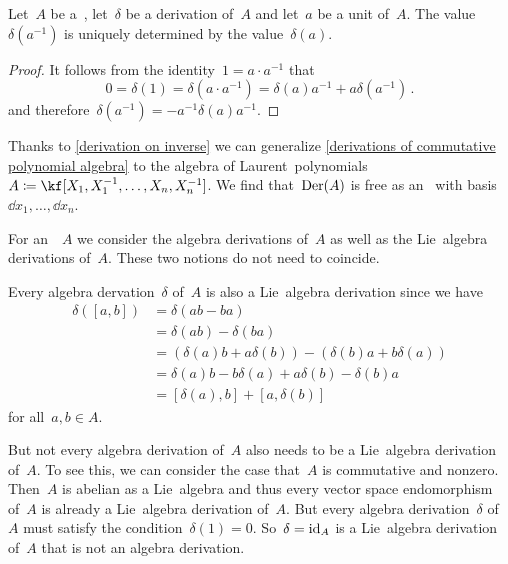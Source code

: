 \begin{proposition}
	\label{derivation on inverse}
	Let~$A$ be a~\algebra{$\kf$}, let~$\delta$ be a derivation of~$A$ and let~$a$ be a unit of~$A$.
	The value~$\delta(a^{-1})$ is uniquely determined by the value~$\delta(a)$.
\end{proposition}


\begin{proof}
	It follows from the identity~$1 = a \cdot a^{-1}$ that
	\[
		0
		=
		\delta(1)
		=
		\delta(a \cdot a^{-1})
		=
		\delta(a) a^{-1} + a \delta(a^{-1}) \,.
	\]
	and therefore~$\delta(a^{-1}) = - a^{-1} \delta(a) a^{-1}$.
\end{proof}


\begin{example}
	Thanks to \cref{derivation on inverse} we can generalize \cref{derivations of commutative polynomial algebra} to the algebra of Laurent~polynomials~$A \defined \kf[X_1, X_1^{-1}, \dotsc, X_n, X_n^{-1}]$.
	We find that~$\operatorname{Der}(A)$ is free as an~ with basis~$\dd{x_1}, \dotsc, \dd{x_n}$.
\end{example}


\begin{remark}
	For an~\algebra{$\kf$}~$A$ we consider the algebra derivations of~$A$ as well as the Lie~algebra derivations of~$A$.
	These two notions do not need to coincide.

	Every algebra dervation~$\delta$ of~$A$ is also a Lie~algebra derivation since we have
	\begin{align*}
		\delta([a,b])
		&=
		\delta(ab - ba)
		\\
		&=
		\delta(ab) - \delta(ba)
		\\
		&=
		( \delta(a) b + a \delta(b) ) - ( \delta(b) a + b \delta(a) )
		\\
		&=
		\delta(a) b - b \delta(a) + a \delta(b) - \delta(b) a
		\\
		&=
		[\delta(a), b] + [a, \delta(b)]
	\end{align*}
	for all~$a, b \in A$.

	But not every algebra derivation of~$A$ also needs to be a Lie~algebra derivation of~$A$.
	To see this, we can consider the case that~$A$ is commutative and nonzero.
	Then~$A$ is abelian as a Lie~algebra and thus every vector space endomorphism of~$A$ is already a Lie~algebra derivation of~$A$.
	But every algebra derivation~$\delta$ of~$A$ must satisfy the condition~$\delta(1) = 0$.
	So~$\delta = \mathrm{id}_A$ is a Lie~algebra derivation of~$A$ that is not an algebra derivation.
\end{remark}


